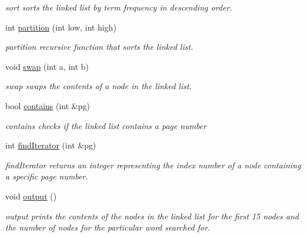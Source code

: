 \begin{DoxyCompactItemize}
\begin{DoxyCompactList}\small\item\em sort sorts the linked list by term frequency in descending order. \end{DoxyCompactList}\item 
int \hyperlink{class_linked_list_aabad92ed4258e22f8f25ef4db83ace63}{partition} (int low, int high)
\begin{DoxyCompactList}\small\item\em partition recursive function that sorts the linked list. \end{DoxyCompactList}\item 
void \hyperlink{class_linked_list_a6328a045297f16d1ae2f3964126f1d3e}{swap} (int a, int b)
\begin{DoxyCompactList}\small\item\em swap swaps the contents of a node in the linked list. \end{DoxyCompactList}\item 
bool \hyperlink{class_linked_list_a9ccb3e8a33f1f6a12884782b93a837ae}{contains} (int \&pg)
\begin{DoxyCompactList}\small\item\em contains checks if the linked list contains a page number \end{DoxyCompactList}\item 
int \hyperlink{class_linked_list_ae43a82e40aaf7709c34cf989a2905750}{find\-Iterator} (int \&pg)
\begin{DoxyCompactList}\small\item\em find\-Iterator returns an integer representing the index number of a node containing a specific page number. \end{DoxyCompactList}\item 
void \hyperlink{class_linked_list_a420d35a949ef7acbb5cd13a2900fe813}{output} ()
\begin{DoxyCompactList}\small\item\em output prints the contents of the nodes in the linked list for the first 15 nodes and the number of nodes for the particular word searched for. \end{DoxyCompactList}\end{DoxyCompactItemize}


